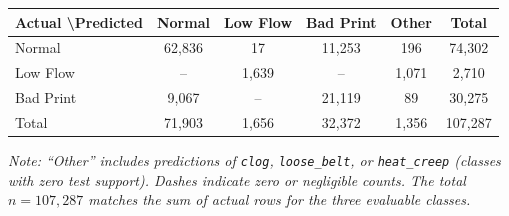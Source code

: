 \begin{tabular}{|l|c|c|c|c|c|}
\hline
\rowcolor{primary}
\textbf{\color{white}Actual \textbackslash Predicted} & \textbf{\color{white}Normal} & \textbf{\color{white}Low Flow} & \textbf{\color{white}Bad Print} & \textbf{\color{white}Other} & \textbf{\color{white}Total} \\
\hline
Normal & 62,836 & 17 & 11,253 & 196 & 74,302 \\
\hline
Low Flow & -- & 1,639 & -- & 1,071 & 2,710 \\
\hline
Bad Print & 9,067 & -- & 21,119 & 89 & 30,275 \\
\hline
Total & 71,903 & 1,656 & 32,372 & 1,356 & 107,287 \\
\hline
\end{tabular}
\par\smallskip
\footnotesize{\textit{Note: ``Other'' includes predictions of \texttt{clog}, \texttt{loose\_belt}, or \texttt{heat\_creep} (classes with zero test support). Dashes indicate zero or negligible counts. The total $n = 107{,}287$ matches the sum of actual rows for the three evaluable classes.}}